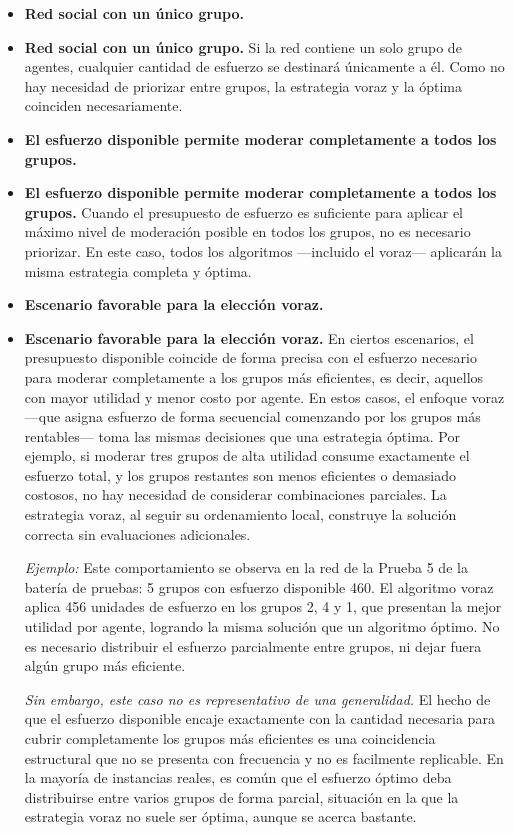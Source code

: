 \documentclass[11pt,letter]{article}
\begin{document}
    \begin{itemize}
        \item \textbf{Red social con un único grupo.}
        \item \textbf{Red social con un único grupo.}
        Si la red contiene un solo grupo de agentes, cualquier cantidad de esfuerzo se destinará únicamente a él. Como no hay necesidad de priorizar entre grupos, la estrategia voraz y la óptima coinciden necesariamente.


        \item \textbf{El esfuerzo disponible permite moderar completamente a todos los grupos.}

        \item \textbf{El esfuerzo disponible permite moderar completamente a todos los grupos.}
        Cuando el presupuesto de esfuerzo es suficiente para aplicar el máximo nivel de moderación posible en todos los grupos, no es necesario priorizar. En este caso, todos los algoritmos —incluido el voraz— aplicarán la misma estrategia completa y óptima.

    \item \textbf{Escenario favorable para la elección voraz.}

    \item \textbf{Escenario favorable para la elección voraz.}
En ciertos escenarios, el presupuesto disponible coincide de forma precisa con el esfuerzo necesario para moderar completamente a los grupos más eficientes, es decir, aquellos con mayor utilidad y menor costo por agente. En estos casos, el enfoque voraz —que asigna esfuerzo de forma secuencial comenzando por los grupos más rentables— toma las mismas decisiones que una estrategia óptima. Por ejemplo, si moderar tres grupos de alta utilidad consume exactamente el esfuerzo total, y los grupos restantes son menos eficientes o demasiado costosos, no hay necesidad de considerar combinaciones parciales. La estrategia voraz, al seguir su ordenamiento local, construye la solución correcta sin evaluaciones adicionales.

\textit{Ejemplo:} Este comportamiento se observa en la red de la Prueba 5 de la batería de pruebas: 5 grupos con esfuerzo disponible 460. El algoritmo voraz aplica 456 unidades de esfuerzo en los grupos 2, 4 y 1, que presentan la mejor utilidad por agente, logrando la misma solución que un algoritmo óptimo. No es necesario distribuir el esfuerzo parcialmente entre grupos, ni dejar fuera algún grupo más eficiente.

\textit{Sin embargo, este caso no es representativo de una generalidad.} El hecho de que el esfuerzo disponible encaje exactamente con la cantidad necesaria para cubrir completamente los grupos más eficientes es una coincidencia estructural que no se presenta con frecuencia y no es facilmente replicable. En la mayoría de instancias reales, es común que el esfuerzo óptimo deba distribuirse entre varios grupos de forma parcial, situación en la que la estrategia voraz no suele ser óptima, aunque se acerca bastante.

    \end{itemize}
\end{document}

